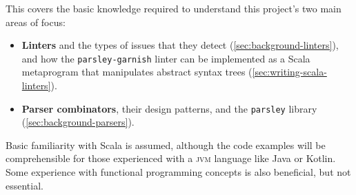 \documentclass[../../main.tex]{subfiles}
\begin{document}
\label{sec:background}
This  covers the basic knowledge required to understand this project's two main areas of focus:
\begin{itemize}
  \item \textbf{Linters} and the types of issues that they detect (\cref{sec:background-linters}), and how the \texttt{parsley-garnish} linter can be implemented as a Scala metaprogram that manipulates abstract syntax trees (\cref{sec:writing-scala-linters}).
  \item \textbf{Parser combinators}, their design patterns, and the \texttt{parsley} library (\cref{sec:background-parsers}).
\end{itemize}
%
Basic familiarity with Scala is assumed, although the code examples will be comprehensible for those experienced with a \textsc{jvm} language like Java or Kotlin.
Some experience with functional programming concepts is also beneficial, but not essential.

%
\pagebreak
%
\end{document}
